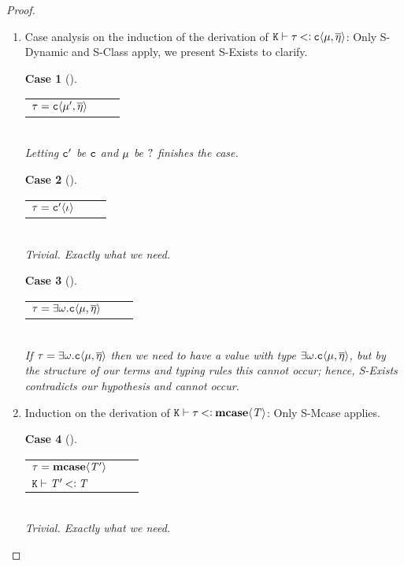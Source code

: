 \documentclass[onecolumn,nocopyrightspace]{sigplanconf}
\theoremstyle{lessintrusive}
\theoremstyle{plain}
\theoremstyle{custom}
\newtheorem*{case}{Case}
\begin{document}
\begin{proof}
\leavevmode

\begin{enumerate}[(\arabic*)] 

\item Case analysis on the induction of the derivation of $\mathtt{K}\vdash\tau\mathbin{<\vcentcolon}\mathtt{c}\langle\mu,\overline{\eta}\rangle$: Only S-Dynamic and S-Class apply, we present S-Exists to clarify.

\begin{case}[] 
\begin{tabular}{>{$}l<{$} >{$}l<{$} >{$}l<{$}}
\t = \classargs{\mode',\overline{\basemode}} & & \\
\end{tabular}\\ 
Letting $\Cname'$ be $\Cname$ and $\mode$ be $\dynmode$ finishes the case.
\end{case} 

\begin{case}[] 
\begin{tabular}{>{$}l<{$} >{$}l<{$} >{$}l<{$}}
\t = \classargsp{\listi} & & \\
\end{tabular}\\ 
Trivial. Exactly what we need.
\end{case} 

\begin{case}[] 
\begin{tabular}{>{$}l<{$} >{$}l<{$} >{$}l<{$}}
\t = \texist{\econs}.\classargs{\mode,\overline{\basemode}} & & \\ 
\end{tabular}\\ 
If $\t = \texist{\econs}.\classargs{\mode,\overline{\basemode}}$ then we need to have a value with type $\texist{\econs}.\classargs{\mode,\overline{\basemode}}$, but by the structure of our terms and typing rules this cannot occur; hence, S-Exists contradicts our hypothesis and cannot occur.
\end{case} 

\item Induction on the derivation of $\mathtt{K}\vdash\tau\mathbin{<\vcentcolon}\texttt{\bf mcase}\langle\mathit{T}\rangle$: Only S-Mcase applies.

\begin{case}[] 
\begin{tabular}{>{$}l<{$} >{$}l<{$} >{$}l<{$}}
\t = \tmcase{\bt'} & & \\
\cset\vdash\bt'\tsub\bt & & \\
\end{tabular}\\ 
Trivial. Exactly what we need.
\end{case} 

\end{enumerate}

\end{proof}
\end{document}
